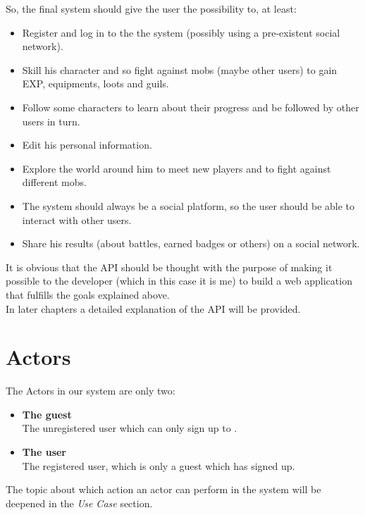 	So, the final system should give the user the possibility to, at least:
	\newcommand{\goalSignup}{Register and log in to the the system (possibly using a pre-existent social network).}
	\newcommand{\goalSkill}{Skill his character and so fight against mobs (maybe other users) to gain
			EXP, equipments, loots and guils.}
	\newcommand{\goalFollow}{Follow some characters to learn about their progress and be followed by other users in turn.}
	\newcommand{\goalProfile}{Edit his personal information.}
	\newcommand{\goalExplore}{Explore the world around him to meet new players and to fight against different mobs.}
	\newcommand{\goalSocial}{The system should always be a social platform, so the user should be able to 
			interact with other users.}
	\newcommand{\goalShare}{Share his results (about battles, earned badges or others) on a social network.}
	\begin{itemize}
		\item \goalSignup
		\item \goalSkill
		\item \goalFollow
		\item \goalProfile
		\item \goalExplore
		\item \goalSocial
		\item \goalShare
	\end{itemize}

	It is obvious that the API should be thought with the purpose of making it possible to the developer 
	(which in this case it is me) to build a web application that fulfills the goals explained above.\\
	In later chapters a detailed explanation of the API will be provided.

	\section{Actors}
	The Actors in our system are only two:
	\begin{itemize}
		\item \textbf{The guest}\\
		The unregistered user which can only sign up to \SocialBattle{}.
		\item \textbf{The user}\\
		The registered user, which is only a guest which has signed up.
	\end{itemize}
	The topic about which action an actor can perform in the system will be deepened in the \textit{Use Case} section.